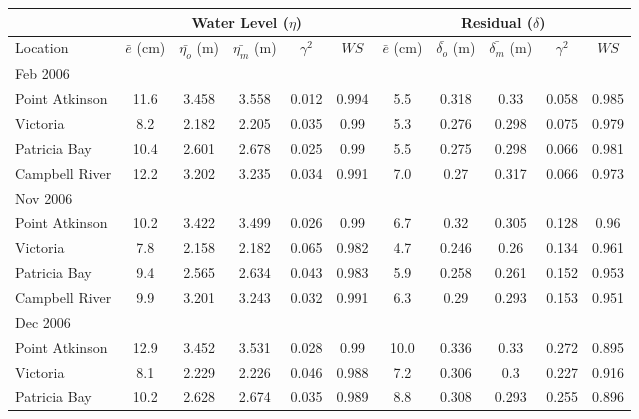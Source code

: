 \documentclass[letterpaper]{tATO2e}
\begin{document}
\begin{table}[h]
\centering 
{} 
{\begin{tabular}{|l |c c c c c | c c c c c|} 
\hline 
& \multicolumn{5}{|c|}{Water Level ($\eta$)}        & \multicolumn{5}{|c|}{Residual ($\delta$)} \\ 
\hline 
Location       & $\bar{e}$ (cm) & $\bar{\eta_{o}}$ (m) & $\bar{\eta_{m}}$ (m) & $\gamma^2$ & $WS$   & $\bar{e}$ (cm) & $\bar{\delta_{o}}$ (m) & $\bar{\delta_{m}}$ (m) & $\gamma^2$ & $WS$ \\
\hline 
Feb 2006& & & & & & & & & &\\ 
Point Atkinson & 11.6& 3.458& 3.558& 0.012& 0.994& 5.5& 0.318& 0.33& 0.058& 0.985\\
Victoria       & 8.2& 2.182& 2.205& 0.035& 0.99& 5.3& 0.276& 0.298& 0.075& 0.979\\
Patricia Bay   & 10.4& 2.601& 2.678& 0.025& 0.99& 5.5& 0.275& 0.298& 0.066& 0.981\\
Campbell River & 12.2& 3.202& 3.235& 0.034& 0.991& 7.0& 0.27& 0.317& 0.066& 0.973\\
\hline
Nov 2006& & & & & & & & & & \\
Point Atkinson & 10.2& 3.422& 3.499& 0.026& 0.99& 6.7& 0.32& 0.305& 0.128& 0.96\\
Victoria       & 7.8& 2.158& 2.182& 0.065& 0.982& 4.7& 0.246& 0.26& 0.134& 0.961\\
Patricia Bay   & 9.4& 2.565& 2.634& 0.043& 0.983& 5.9& 0.258& 0.261& 0.152& 0.953\\
Campbell River & 9.9& 3.201& 3.243& 0.032& 0.991& 6.3& 0.29& 0.293& 0.153& 0.951\\
\hline
Dec 2006& & & & & & & & & & \\
Point Atkinson & 12.9& 3.452& 3.531& 0.028& 0.99& 10.0& 0.336& 0.33& 0.272& 0.895\\
Victoria       & 8.1& 2.229& 2.226& 0.046& 0.988& 7.2& 0.306& 0.3& 0.227& 0.916\\
Patricia Bay   & 10.2& 2.628& 2.674& 0.035& 0.989& 8.8& 0.308& 0.293& 0.255& 0.896\\

\end{tabular}}
\end{table}
\end{document}
